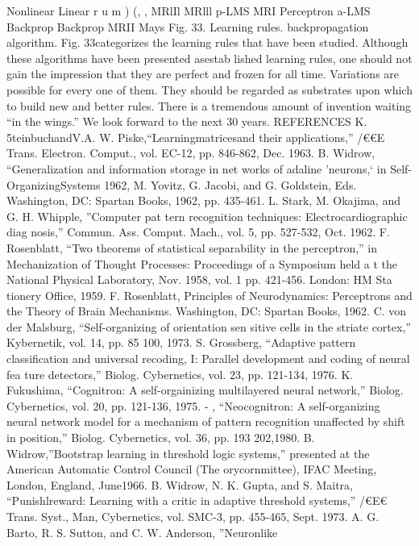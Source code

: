 \documentclass[11pt,a4paper,twocolumn]{article}
\begin{document}
{{Nonlinear 
Linear 
r u m )  
(, , 
MRlIl 
MRlll 
p-LMS 
MRI 
Perceptron 
a-LMS 
Backprop 
Backprop 
MRII 
Mays 
Fig. 33. Learning rules. 
backpropagation algorithm. Fig. 33categorizes the learning 
rules that have been studied. 
Although these algorithms have been presented asestab
lished learning rules, one should not gain the impression 
that they are perfect and frozen for all time. Variations are 
possible for every one of them. They should be regarded 
as substrates upon which to build new and better rules. 
There is a tremendous amount of invention waiting “in the 
wings.” We look forward to the next 30 years. 
REFERENCES 
K. 5teinbuchandV.A. W. Piske,“Learningmatricesand their 
applications,” /€€E Trans. Electron. Comput., vol. EC-12, pp. 
846-862, Dec. 1963. 
B. Widrow, “Generalization and information storage in net
works of adaline ’neurons,‘ in Self-OrganizingSystems 1962, 
M. Yovitz, G. Jacobi, and G. Goldstein, Eds. Washington, 
DC: Spartan Books, 1962, pp. 435-461. 
L. Stark, M. Okajima, and G. H. Whipple, ”Computer pat
tern recognition techniques: Electrocardiographic diag
nosis,” Commun. Ass. Comput. Mach., vol. 5, pp. 527-532, 
Oct. 1962. 
F. Rosenblatt, “Two theorems of statistical separability in 
the perceptron,” in Mechanization of Thought Processes: 
Proceedings of a Symposium held a t  the National Physical 
Laboratory, Nov. 1958, vol. 1 pp. 421-456. London: HM Sta
tionery Office, 1959. 
F. Rosenblatt, Principles of Neurodynamics: Perceptrons and 
the Theory of Brain Mechanisms. Washington, DC: Spartan 
Books, 1962. 
C. von der Malsburg, “Self-organizing of orientation sen
sitive cells in the striate cortex,” Kybernetik, vol. 14, pp. 85
100, 1973. 
S. Grossberg, “Adaptive pattern classification and universal 
recoding, I: Parallel development and coding of neural fea
ture detectors,” Biolog. Cybernetics, vol. 23, pp. 121-134, 
1976. 
K. Fukushima, “Cognitron: A self-orgainizing multilayered 
neural network,” Biolog. Cybernetics, vol. 20, pp. 121-136, 
1975. 
- 
, “Neocognitron: A self-organizing neural network 
model for a mechanism of pattern recognition unaffected 
by shift in position,” Biolog. Cybernetics, vol. 36, pp. 193
202,1980. 
B. Widrow,”Bootstrap learning in threshold logic systems,” 
presented at the American Automatic Control Council (The
orycornmittee), IFAC Meeting, London, England, June1966. 
B. Widrow, N. K. Gupta, and S. Maitra, “Punishlreward: 
Learning with a critic in adaptive threshold systems,” /€E€ 
Trans. Syst., Man, Cybernetics, vol. SMC-3, pp. 455-465, Sept. 
1973. 
A. G. Barto, R. S. Sutton, and C. W. Anderson, ”Neuronlike 
}}
\end{document}
